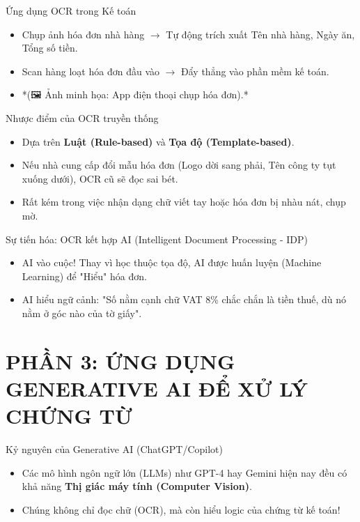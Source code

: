 \documentclass[aspectratio=169]{beamer}
\begin{document}
\begin{frame}{Ứng dụng OCR trong Kế toán}
    \begin{itemize}
        \item Chụp ảnh hóa đơn nhà hàng $\rightarrow$ Tự động trích xuất Tên nhà hàng, Ngày ăn, Tổng số tiền.
        \item Scan hàng loạt hóa đơn đầu vào $\rightarrow$ Đẩy thẳng vào phần mềm kế toán.
        \item *(🖼️ Ảnh minh họa: App điện thoại chụp hóa đơn).*
    \end{itemize}
\end{frame}


\begin{frame}{Nhược điểm của OCR truyền thống}
    \begin{itemize}
        \item Dựa trên \textbf{Luật (Rule-based)} và \textbf{Tọa độ (Template-based)}.
        \item Nếu nhà cung cấp đổi mẫu hóa đơn (Logo dời sang phải, Tên công ty tụt xuống dưới), OCR cũ sẽ đọc sai bét.
        \item Rất kém trong việc nhận dạng chữ viết tay hoặc hóa đơn bị nhàu nát, chụp mờ.
    \end{itemize}
\end{frame}


\begin{frame}{Sự tiến hóa: OCR kết hợp AI (Intelligent Document Processing - IDP)}
    \begin{itemize}
        \item AI vào cuộc! Thay vì học thuộc tọa độ, AI được huấn luyện (Machine Learning) để "Hiểu" hóa đơn.
        \item AI hiểu ngữ cảnh: "Số nằm cạnh chữ VAT 8\% chắc chắn là tiền thuế, dù nó nằm ở góc nào của tờ giấy".
    \end{itemize}
\end{frame}


\section{PHẦN 3: ỨNG DỤNG GENERATIVE AI ĐỂ XỬ LÝ CHỨNG TỪ}


\begin{frame}{Kỷ nguyên của Generative AI (ChatGPT/Copilot)}
    \begin{itemize}
        \item Các mô hình ngôn ngữ lớn (LLMs) như GPT-4 hay Gemini hiện nay đều có khả năng \textbf{Thị giác máy tính (Computer Vision)}.
        \item Chúng không chỉ đọc chữ (OCR), mà còn hiểu logic của chứng từ kế toán!
    \end{itemize}
\end{frame}
\end{document}
